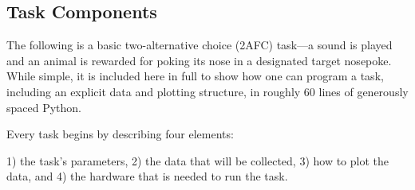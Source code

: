 \documentclass[nohyper, justified, notitlepage, marginals=raggedright,twoside=false,debug]{tufte-autopilot}
\begin{document}
\subsection{Task Components}
\label{sec:taskcomponents}

The following is a basic two-alternative choice (2AFC) task---a sound is played and an animal is rewarded for poking its nose in a designated target nosepoke. While simple, it is included here in full to show how one can program a task, including an explicit data and plotting structure, in roughly 60 lines of generously spaced Python.

\vspace{12pt}

Every task begins by describing four elements: 

1) the task's parameters, 2) the data that will be collected, 3) how to plot the data, and 4) the hardware that is needed to run the task.
\end{document}
